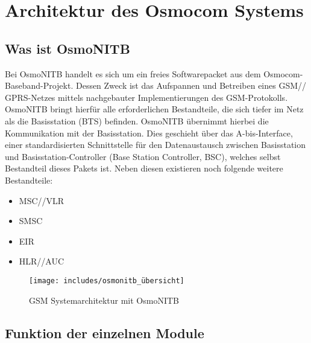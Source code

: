 \section{Architektur des Osmocom Systems}


\subsection{Was ist OsmoNITB}
Bei OsmoNITB handelt es sich um ein freies Softwarepacket aus dem Osmocom-Baseband-Projekt. Dessen Zweck ist das Aufspannen und Betreiben eines GSM// GPRS-Netzes mittels nachgebauter Implementierungen des GSM-Protokolls. OsmoNITB bringt hierfür alle erforderlichen Bestandteile, die sich tiefer im Netz als die Basisstation (BTS) befinden. OsmoNITB übernimmt hierbei die Kommunikation mit der Basisstation. Dies geschieht über das A-bis-Interface, einer standardisierten Schnittstelle für den Datenaustausch zwischen Basisstation und Basisstation-Controller (Base Station Controller, BSC), welches selbst Bestandteil dieses Pakets ist. Neben diesen existieren noch folgende weitere Bestandteile:




\begin{itemize}
\item MSC//VLR\\
\item SMSC\\
\item EIR\\
\item HLR//AUC\\
\end{itemize}



\begin{figure}[htbp]
    \centering
    \texttt{[image: includes/osmonitb\_übersicht]}
    \caption{GSM Systemarchitektur mit OsmoNITB}
	\label{fig:osmonitb}
\end{figure}






\subsection{Funktion der einzelnen Module}




